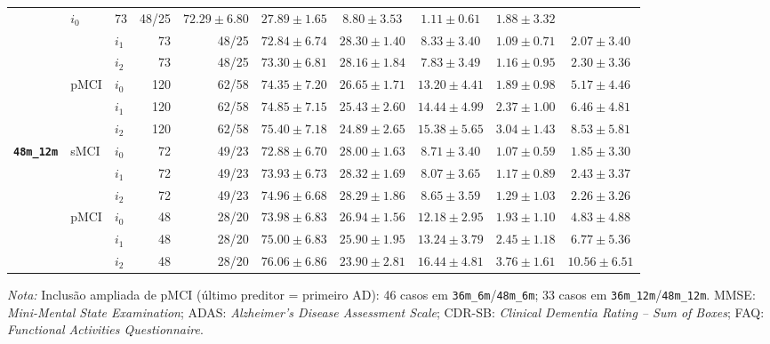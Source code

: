 \documentclass[review]{elsarticle}
\newcommand{\code}[1]{\texttt{#1}}
\begin{document}
\begin{table}[htbp]
{\begin{tabular}{lllrrccccc}
			& $i_0$ & 73 & 48/25 & $72.29\pm6.80$ & $27.89\pm1.65$ & $8.80\pm3.53$ & $1.11\pm0.61$ & $1.88\pm3.32$ \\
			& & $i_1$ & 73 & 48/25 & $72.84\pm6.74$ & $28.30\pm1.40$ & $8.33\pm3.40$ & $1.09\pm0.71$ & $2.07\pm3.40$ \\
			& & $i_2$ & 73 & 48/25 & $73.30\pm6.81$ & $28.16\pm1.84$ & $7.83\pm3.49$ & $1.16\pm0.95$ & $2.30\pm3.36$ \\
			\cmidrule{2-10}
			& \multirow{3}{*}{pMCI}
			& $i_0$ & 120 & 62/58 & $74.35\pm7.20$ & $26.65\pm1.71$ & $13.20\pm4.41$ & $1.89\pm0.98$ & $5.17\pm4.46$ \\
			& & $i_1$ & 120 & 62/58 & $74.85\pm7.15$ & $25.43\pm2.60$ & $14.44\pm4.99$ & $2.37\pm1.00$ & $6.46\pm4.81$ \\
			& & $i_2$ & 120 & 62/58 & $75.40\pm7.18$ & $24.89\pm2.65$ & $15.38\pm5.65$ & $3.04\pm1.43$ & $8.53\pm5.81$ \\
			\midrule
			\multirow{6}{*}{\textbf{\code{48m\_12m}}}
			& \multirow{3}{*}{sMCI}
			& $i_0$ & 72 & 49/23 & $72.88\pm6.70$ & $28.00\pm1.63$ & $8.71\pm3.40$ & $1.07\pm0.59$ & $1.85\pm3.30$ \\
			& & $i_1$ & 72 & 49/23 & $73.93\pm6.73$ & $28.32\pm1.69$ & $8.07\pm3.65$ & $1.17\pm0.89$ & $2.43\pm3.37$ \\
			& & $i_2$ & 72 & 49/23 & $74.96\pm6.68$ & $28.29\pm1.86$ & $8.65\pm3.59$ & $1.29\pm1.03$ & $2.26\pm3.26$ \\
			\cmidrule{2-10}
			& \multirow{3}{*}{pMCI}
			& $i_0$ & 48 & 28/20 & $73.98\pm6.83$ & $26.94\pm1.56$ & $12.18\pm2.95$ & $1.93\pm1.10$ & $4.83\pm4.88$ \\
			& & $i_1$ & 48 & 28/20 & $75.00\pm6.83$ & $25.90\pm1.95$ & $13.24\pm3.79$ & $2.45\pm1.18$ & $6.77\pm5.36$ \\
			& & $i_2$ & 48 & 28/20 & $76.06\pm6.86$ & $23.90\pm2.81$ & $16.44\pm4.81$ & $3.76\pm1.61$ & $10.56\pm6.51$ \\
			\bottomrule
		\end{tabular}%
	}
	\begin{flushleft}
		\footnotesize
		\textit{Nota:} Inclusão ampliada de pMCI (último preditor = primeiro AD): 46 casos em \code{36m\_6m}/\code{48m\_6m}; 33 casos em \code{36m\_12m}/\code{48m\_12m}. MMSE: \textit{Mini-Mental State Examination}; ADAS: \textit{Alzheimer's Disease Assessment Scale}; CDR-SB: \textit{Clinical Dementia Rating -- Sum of Boxes}; FAQ: \textit{Functional Activities Questionnaire}. 
	\end{flushleft}
\end{table}
\end{document}
